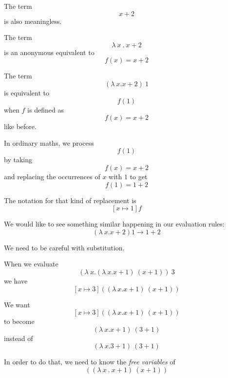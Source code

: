 \begin{frame}
  The term
  \[x + 2\]
  is also meaningless.
\end{frame}

\begin{frame}
  The term
  \[\lambda~x~.~x + 2\]
  is an anonymous equivalent to
  \[f(x) = x + 2\]
\end{frame}

\begin{frame}
  The term
  \[(\lambda~x . x + 2)~1 \]
  is equivalent to
  \[f(1)\]
  when $f$ is defined as
  \[f(x) = x + 2\]
  like before.
\end{frame}

\begin{frame}
  In ordinary maths, we process
  \[f(1)\]
  by taking
  \[f(x) = x + 2\]
  and replacing the occurrences of $x$ with $1$ to get
  \[f(1) = 1 + 2\]
\end{frame}

\begin{frame}
  The notation for that kind of replacement is
  \[\left[ x \mapsto 1 \right] f \]
\end{frame}

\begin{frame}
  We would like to see something similar happening in our evaluation rules:
  \[(\lambda~x . x + 2) 1 \longrightarrow 1 + 2\]
\end{frame}

\begin{frame}
  We need to be careful with substitution.
\end{frame}

\begin{frame}
  When we evaluate
  \[\left(\lambda~x . \left( \lambda~x . x + 1 \right)~\left(x + 1\right)\right)~3 \]
  we have
  \[\left[ x \mapsto 3 \right]
      \left( \left( \lambda~x . x + 1 \right)~\left(x + 1\right) \right)
  \] 
\end{frame}

\begin{frame}
  We want
  \[\left[ x \mapsto 3 \right]
      \left( \left( \lambda~x . x + 1 \right)~\left(x + 1\right) \right)
  \] 
  to become
  \[\left( \lambda~x . x + 1 \right)~(3 + 1)\]
  instead of
  \[\left( \lambda~x . 3 + 1 \right)~(3 + 1)\]
\end{frame}

\begin{frame}
  In order to do that, we need to know the {\it free variables} of
  \[
      \left( \left( \lambda~x~.~x + 1 \right)~\left(x + 1\right) \right)
  \] 
\end{frame}

